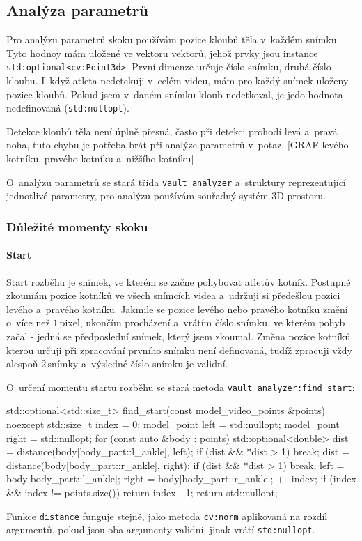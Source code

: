 \subsection{Analýza parametrů}

Pro analýzu parametrů skoku používám pozice kloubů těla v~každém snímku. Tyto hodnoy mám uložené ve vektoru vektorů, jehož prvky jsou instance \texttt{std\::optional<cv\::Point3d>}. První dimenze určuje číslo snímku, druhá číslo kloubu. I~když atleta nedetekuji v~celém videu, mám pro každý snímek uloženy pozice kloubů. Pokud jsem v~daném snímku kloub nedetkoval, je jedo hodnota nedefinovaná (\texttt{std\::nullopt}).

Detekce kloubů těla není úplně přesná, často při detekci prohodí levá a~pravá noha, tuto chybu je potřeba brát při analýze parametrů v~potaz. [GRAF levého kotníku, pravého kotníku a~nižšího kotníku]

O~analýzu parametrů se stará třída \texttt{vault\_analyzer} a~struktury reprezentující jednotlivé parametry, pro analýzu používám souřadný systém 3D prostoru.


\subsubsection{Důležité momenty skoku}

\paragraph{Start}

Start rozběhu je snímek, ve kterém se začne pohybovat atletův kotník. Postupně zkoumám pozice kotníků ve všech snímcích videa a~udržuji si předešlou pozici levého a~pravého kotníku. Jakmile se pozice levého nebo pravého kotníku změní o~více než $1$\,\rm pixel, ukončím procházení a~vrátím číslo snímku, ve kterém pohyb začal - jedná se předposlední snímek, který jsem zkoumal. Změna pozice kotníků, kterou určuji při zpracování prvního snímku není definovaná, tudíž zpracuji vždy alespoň $2$\,\rm snímky a~výsledné číslo snímku je validní.

O~určení momentu startu rozběhu se stará metoda \texttt{vault\_analyzer\::find\_start}:
\begin{code}[fontsize=\footnotesize]
std::optional<std::size_t> find_start(const model_video_points &points)
noexcept {
    std::size_t index = 0;
    model_point left = std::nullopt;
    model_point right = std::nullopt;
    for (const auto &body : points) {
        std::optional<double> dist =
            distance(body[body_part::l_ankle], left);
        if (dist && *dist > 1) break;
        dist = distance(body[body_part::r_ankle], right);
        if (dist && *dist > 1) break;
        left = body[body_part::l_ankle];
        right = body[body_part::r_ankle];
        ++index;
    }
    if (index && index != points.size())
        return index - 1;
    return std::nullopt;
}
\end{code}
Funkce \texttt{distance} funguje stejně, jako metoda \texttt{cv\::norm} aplikovaná na rozdíl argumentů, pokud jsou oba argumenty validní, jinak vrátí \texttt{std\::nullopt}.

